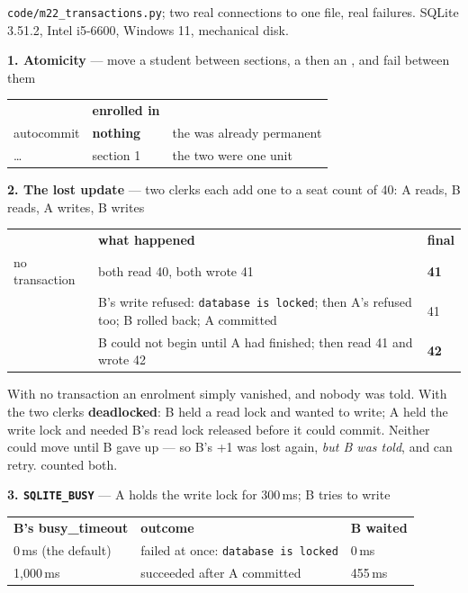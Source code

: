 \begin{measured}
\textsf{\footnotesize \texttt{code/m22\_transactions.py}; two real connections
to one file, real failures. SQLite 3.51.2, Intel i5-6600, Windows 11,
mechanical disk.}

\medskip
\textbf{1. Atomicity} --- move a student between sections, a 
then an , and fail between them

\begin{tabular}{@{}L{4.4cm}L{3.4cm}L{6.0cm}@{}}
& \textbf{enrolled in} & \\
autocommit & \textbf{nothing} & the  was already permanent \\
 \dots\  & section 1 & the two were one unit \\
\end{tabular}

\medskip
\textbf{2. The lost update} --- two clerks each add one to a seat count of 40:
A reads, B reads, A writes, B writes

\begin{tabular}{@{}L{3.4cm}L{8.6cm}R{1.6cm}@{}}
& \textbf{what happened} & \textbf{final} \\
no transaction & both read 40, both wrote 41 & \textbf{41} \\
 & B's write refused: \texttt{database is locked}; then
  A's  refused too; B rolled back; A committed & 41 \\
 & B could not begin until A had finished; then read 41
  and wrote 42 & \textbf{42} \\
\end{tabular}

\smallskip
With no transaction an enrolment simply vanished, and nobody was told. With
 the two clerks \textbf{deadlocked}: B held a read lock and
wanted to write; A held the write lock and needed B's read lock released before
it could commit. Neither could move until B gave up --- so B's +1 was lost
again, \emph{but B was told}, and can retry.  counted both.

\medskip
\textbf{3. \texttt{SQLITE\_BUSY}} --- A holds the write lock for 300\,ms; B
tries to write

\begin{tabular}{@{}L{4.4cm}L{6.0cm}R{3.0cm}@{}}
\textbf{B's busy\_timeout} & \textbf{outcome} & \textbf{B waited} \\
0\,ms (the default) & failed at once: \texttt{database is locked} & 0\,ms \\
1{,}000\,ms & succeeded after A committed & 455\,ms \\
\end{tabular}


\end{measured}
